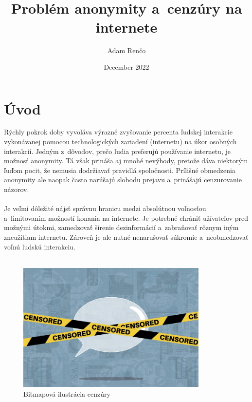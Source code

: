 \documentclass{artikel1}
\title{Problém anonymity a~cenzúry na internete}
\author{Adam Renčo}
\date{December 2022}
\begin{document}
\setcounter{page}{5} %
\setcounter{page}{1}
\maketitle

\section{Úvod}

Rýchly pokrok doby  vyvoláva výrazné zvyšovanie percenta ľudskej interakcie vykonávanej pomocou technologických zariadení (internetu)  na úkor osobných interakcií. Jedným z~dôvodov, prečo ľudia preferujú používanie internetu, je možnosť  anonymity. Tá však prináša aj mnohé nevýhody, pretože dáva niektorým ľuďom pocit, že nemusia dodržiavať pravidlá spoločnosti. Prílišné obmedzenia anonymity ale naopak často narúšajú slobodu prejavu a~prinášajú cenzurovanie názorov.\\\\
Je veľmi dôležité nájsť správnu hranicu medzi absolútnou voľnosťou a~limitovaním možností konania na internete. Je potrebné chrániť užívateľov pred možnými útokmi, zamedzovať šírenie dezinformácií a~zabraňovať rôznym iným zneužitiam internetu. Zároveň je ale nutné nenarušovať súkromie a~neobmedzovať voľnú ľudskú interakciu.\\\\

\begin{figure}[htbp]
    \begin{center}
        \includegraphics[width=0.85\textwidth]{censor}
    \end{center}
    \caption{Bitmapová ilustrácia cenzúry}
    \label{censor}
\end{figure}
\end{document}
